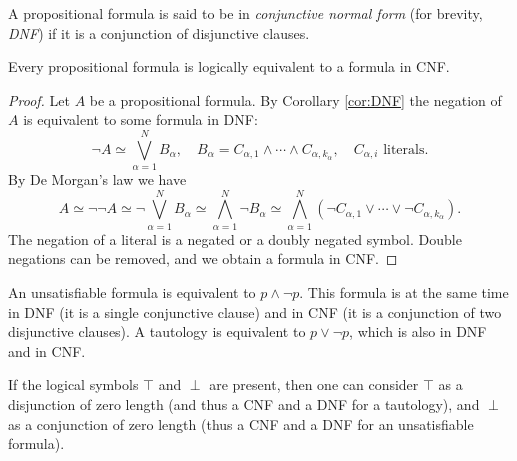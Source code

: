 \begin{page}
\setcounter{section}{1}
\setcounter{subsection}{5}
\setcounter{dfn}{18}
\label{portion:406}

\begin{dfn}
A propositional formula is said to be in \emph{conjunctive normal form} (for brevity, \emph{DNF})
if it is a conjunction of disjunctive clauses.
\end{dfn}

\end{page}

\begin{page}
\setcounter{section}{1}
\setcounter{subsection}{5}
\setcounter{dfn}{19}
\label{portion:409}

\begin{thm}
Every propositional formula is logically equivalent to a formula in CNF.
\end{thm}

\end{page}

\begin{page}
\setcounter{section}{1}
\setcounter{subsection}{5}
\setcounter{dfn}{19}
\label{portion:410}

\begin{proof}
Let $A$ be a propositional formula.
By Corollary \ref{cor:DNF} the negation of $A$ is equivalent to some formula in DNF:
\[
\neg A \simeq \bigvee_{\alpha = 1}^N B_\alpha, \quad B_\alpha = C_{\alpha,1} \wedge \cdots \wedge C_{\alpha,k_{\alpha}}, \quad C_{\alpha,i} \text{ literals}.
\]
By De Morgan's law we have
\[
A \simeq \neg\neg A \simeq \neg \bigvee_{\alpha = 1}^N B_\alpha \simeq \bigwedge_{\alpha = 1}^N \neg B_\alpha
\simeq \bigwedge_{\alpha = 1}^N (\neg C_{\alpha,1} \vee \cdots \vee \neg C_{\alpha,k_{\alpha}}).
\]
The negation of a literal is a negated or a doubly negated symbol.
Double negations can be removed, and we obtain a formula in CNF.
\end{proof}

An unsatisfiable formula is equivalent to $p \wedge \neg p$.
This formula is at the same time in DNF (it is a single conjunctive clause) and in CNF (it is a conjunction of two disjunctive clauses).
A tautology is equivalent to $p \vee \neg p$, which is also in DNF and in CNF.


\end{page}

\begin{page}
\setcounter{section}{1}
\setcounter{subsection}{5}
\setcounter{dfn}{20}
\label{portion:412}

\begin{rem}
If the logical symbols $\top$ and $\perp$ are present, then one can consider $\top$ as a disjunction of zero length
(and thus a CNF and a DNF for a tautology), and $\perp$ as a conjunction of zero length (thus a CNF and a DNF for an unsatisfiable formula).
\end{rem}

\end{page}


